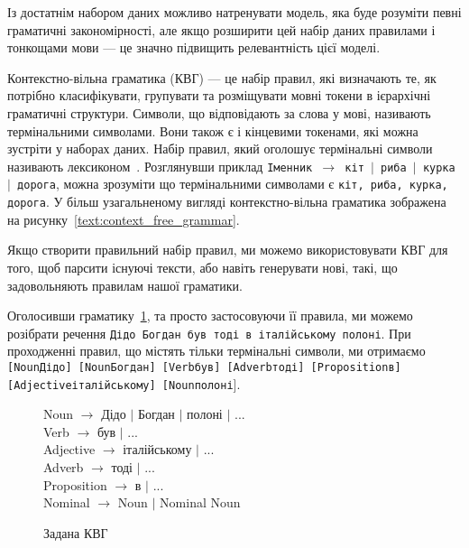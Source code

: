 Із достатнім набором даних можливо натренувати модель, яка буде розуміти певні граматичні
закономірності, але якщо розширити цей набір даних правилами і тонкощами мови --- це значно підвищить релевантність цієї моделі.

Контекстно-вільна граматика (КВГ) --- це набір правил, які визначають те, як потрібно класифікувати,
групувати та розміщувати мовні токени в ієрархічні граматичні структури. Символи, що
відповідають за слова у мові, називають термінальними символами. Вони також є і кінцевими
токенами, які можна зустріти у наборах даних. Набір правил, який оголошує термінальні
символи називають лексиконом~\cite{bib5}. Розглянувши приклад
\texttt{Іменник~$\rightarrow$~кіт~$\mid$~риба~$\mid$~курка~$\mid$~дорога}, можна зрозуміти
що термінальними символами є \texttt{кіт, риба, курка, дорога}. У більш узагальненому
вигляді контекстно-вільна граматика зображена на рисунку~\ref{text:context_free_grammar}.

Якщо створити правильний набір правил, ми можемо використовувати КВГ для того, щоб парсити
існуючі тексти, або навіть генерувати нові, такі, що задовольняють правилам нашої граматики.

Оголосивши граматику~\ref{text:cfg_uk}, та просто застосовуючи її правила,
ми можемо розібрати речення \texttt{Дідо Богдан був тоді в італійському полоні}.
При проходженні правил, що містять тільки термінальні символи, ми отримаємо
\texttt{[{\footnotesize Noun}Дідо] [{\footnotesize Noun}Богдан] 
[{\footnotesize Verb}був] [{\footnotesize Adverb}тоді]
[{\footnotesize Proposition}в] [{\footnotesize Adjective}італійському]
[{\footnotesize Noun}полоні}]. 

\begin{figure}[H]
  \begin{center}
    \noindent Noun $\rightarrow$ Дідо $\mid$ Богдан $\mid$ полоні $\mid$ ... \\
    \noindent Verb $\rightarrow$ був $\mid$ ...\\
    \noindent Adjective $\rightarrow$ італійському $\mid$ ... \\
    \noindent Adverb $\rightarrow$ тоді $\mid$ ... \\
    \noindent Proposition $\rightarrow$ в $\mid$ ... \\
    \noindent Nominal $\rightarrow$ Noun $\mid$ Nominal Noun \\
  \end{center}
  \caption{Задана КВГ}
  \label{text:cfg_uk}
\end{figure}


